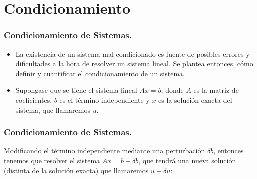 \documentclass{beamer}
\begin{document}
\section{Condicionamiento}
\frame
{
   \frametitle{Condicionamiento de Sistemas.}
   \begin{itemize}
    \item<1-> La existencia de un sistema mal condicionado es fuente de posibles errores y dificultades a la hora de resolver un sistema lineal. Se plantea entonces, c\'omo definir y cuantificar el condicionamiento de un sistema.
    \item<2-> Supongase que se tiene el sistema lineal $Ax = b$, donde $A$ es la matriz de coeficientes, $b$ es el t\'ermino independiente y $x$ es la soluci\'on exacta del sistema, que llamaremos $u$.
   \end{itemize}
}
\frame
{
\frametitle{Condicionamiento de Sistemas.}
 Modificando el t\'ermino independiente mediante una perturbaci\'on $\delta b$, entonces tenemos que resolver el sistema $Ax = b + \delta b$, que tendr\'a una nueva soluci\'on (distinta de la soluci\'on exacta) que llamaremos $u + \delta u$:

}
\end{document}
